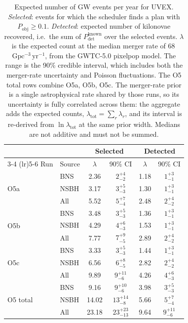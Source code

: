 \begin{table}[!htb]
\centering
\renewcommand\arraystretch{1.15}
\setlength{\tabcolsep}{0.22cm}
\caption{Expected number of GW events per year for UVEX. \emph{Selected}: events for which the scheduler finds a plan with $P_\mathrm{obj} \geq 0.1$. \emph{Detected}: expected number of kilonovae recovered, i.e.\ the sum of $P_\mathrm{det}^\mathrm{known}$ over the selected events. $\lambda$ is the expected count at the median merger rate of 68\,$\mathrm{Gpc^{-3}\,yr^{-1}}$, from the GWTC-5.0 pixelpop model. The range is the 90\% credible interval, which includes both the merger-rate uncertainty and Poisson fluctuations. The O5 total rows combine O5a, O5b, O5c. The merger-rate prior is a single astrophysical rate shared by those runs, so its uncertainty is fully correlated across them: the aggregate adds the expected counts, $\lambda_\mathrm{tot} = \sum_r \lambda_r$, and its interval is re-derived from $\ln \lambda_\mathrm{tot}$ at the same prior width. Medians are not additive and must not be summed.}
\label{tab:uvex-selected-detected-1yr}
\begin{tabular}{llcccc}
\toprule
 & & \multicolumn{2}{c}{Selected} & \multicolumn{2}{c}{Detected} \\
\cmidrule(lr){3-4} \cmidrule(lr){5-6}
Run & Source & $\lambda$ & 90\% CI & $\lambda$ & 90\% CI \\
\midrule
\multirow{3}{*}{O5a} & BNS  & 2.36 & $2^{+4}_{-2}$ & 1.18 & $1^{+3}_{-1}$ \\
                     & NSBH & 3.17 & $3^{+5}_{-3}$ & 1.30 & $1^{+3}_{-1}$ \\
                     & All  & 5.52 & $5^{+7}_{-4}$ & 2.48 & $2^{+4}_{-2}$ \\
\midrule
\multirow{3}{*}{O5b} & BNS  & 3.48 & $3^{+5}_{-3}$ & 1.36 & $1^{+3}_{-1}$ \\
                     & NSBH & 4.29 & $4^{+6}_{-3}$ & 1.53 & $1^{+3}_{-1}$ \\
                     & All  & 7.77 & $7^{+9}_{-5}$ & 2.89 & $2^{+4}_{-2}$ \\
\midrule
\multirow{3}{*}{O5c} & BNS  & 3.33 & $3^{+5}_{-3}$ & 1.44 & $1^{+3}_{-1}$ \\
                     & NSBH & 6.56 & $6^{+8}_{-5}$ & 2.82 & $2^{+4}_{-2}$ \\
                     & All  & 9.89 & $9^{+11}_{-6}$ & 4.26 & $4^{+6}_{-3}$ \\
\midrule
\multirow{3}{*}{O5 total} & BNS  & 9.16 & $9^{+10}_{-6}$ & 3.98 & $3^{+5}_{-3}$ \\
                          & NSBH & 14.02 & $13^{+14}_{-8}$ & 5.66 & $5^{+7}_{-4}$ \\
                          & All  & 23.18 & $23^{+23}_{-13}$ & 9.64 & $9^{+11}_{-6}$ \\
\bottomrule
\end{tabular}
\end{table}
